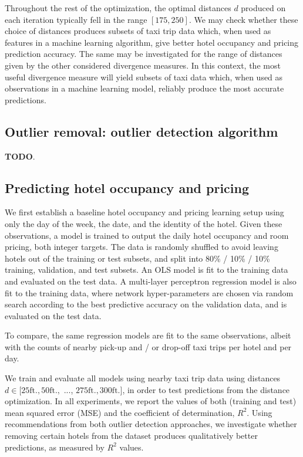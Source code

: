 \documentclass[useAMS, referee, usenatbib]{biom}
\begin{document}
Throughout the rest of the optimization, the optimal distances $d$ produced on each iteration typically fell in the range $[175, 250]$. We may check whether these choice of distances produces subsets of taxi trip data which, when used as features in a machine learning algorithm, give better hotel occupancy and pricing prediction accuracy. The same may be investigated for the range of distances given by the other considered divergence measures. In this context, the most useful divergence measure will yield subsets of taxi data which, when used as observations in a machine learning model, reliably produce the most accurate predictions.

\subsection{Outlier removal: outlier detection algorithm}

\textbf{TODO}.

\subsection{Predicting hotel occupancy and pricing}

We first establish a baseline hotel occupancy and pricing learning setup using only the day of the week, the date, and the identity of the hotel. Given these observations, a model is trained to output the daily hotel occupancy and room pricing, both integer targets. The data is randomly shuffled to avoid leaving hotels out of the training or test subsets, and split into 80\% / 10\% / 10\% training, validation, and test subsets. An OLS model is fit to the training data and evaluated on the test data. A multi-layer perceptron regression model is also fit to the training data, where network hyper-parameters are chosen via random search according to the best predictive accuracy on the validation data, and is evaluated on the test data.

To compare, the same regression models are fit to the same observations, albeit with the counts of nearby pick-up and / or drop-off taxi trips per hotel and per day.

We train and evaluate all models using nearby taxi trip data using distances $d \in [25 \mathrm{ft.}, 50 \mathrm{ft.},$ ..., $275 \mathrm{ft.}, 300 \mathrm{ft.}]$, in order to test predictions from the distance optimization. In all experiments, we report the values of both (training and test) mean squared error (MSE) and the coefficient of determination, $R^2$. Using recommendations from both outlier detection approaches, we investigate whether removing certain hotels from the dataset produces qualitatively better predictions, as measured by $R^2$ values.
\end{document}
